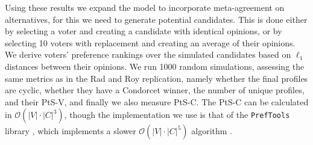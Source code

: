 Using these results we expand the model to
incorporate meta-agreement on alternatives, for this we need to generate
potential candidates. This is done either by selecting a voter and creating a
candidate with identical opinions, or by selecting 10 voters with replacement
and creating an average of their opinions. We derive voters’ preference
rankings over the simulated candidates based on $\ell_1$ distances between
their opinions. We run 1000 random simulations, assessing the same metrics as in the Rad and Roy replication,
namely whether the final profiles are cyclic, whether they have a Condorcet
winner, the number of unique profiles, and their PtS-V, and finally we also
measure PtS-C. The PtS-C can be calculated in $\mathcal{O}(|V| \cdot{} |C|
	^3)$\cite{przedmojskiAlgorithmsExperimentsNearly}, though the implementation we
use is that of the \texttt{PrefTools} library \cite{PrefLibPreflibtools2025},
which implements a slower $\mathcal{O}(|V| \cdot{} |C|^5)$ algorithm
\cite{erdelyiComputationalAspectsNearly2013}.


